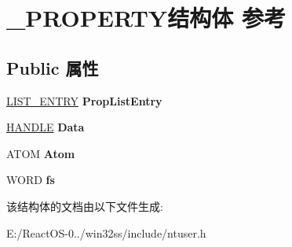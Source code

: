\hypertarget{struct___p_r_o_p_e_r_t_y}{}\section{\+\_\+\+P\+R\+O\+P\+E\+R\+T\+Y结构体 参考}
\label{struct___p_r_o_p_e_r_t_y}
\subsection*{Public 属性}
\begin{DoxyCompactItemize}
\item 
\mbox{\label{struct___p_r_o_p_e_r_t_y_a875aeea1fae17a9e8f4f17c9bbbe9da4}} 
\hyperlink{struct___l_i_s_t___e_n_t_r_y}{L\+I\+S\+T\+\_\+\+E\+N\+T\+RY} {\bfseries Prop\+List\+Entry}
\item 
\mbox{\label{struct___p_r_o_p_e_r_t_y_a2832948d6fc1e722b47ad8b60f69d972}} 
\hyperlink{interfacevoid}{H\+A\+N\+D\+LE} {\bfseries Data}
\item 
\mbox{\label{struct___p_r_o_p_e_r_t_y_add52e8feecb71a1f6739ddc3a3ab39fb}} 
A\+T\+OM {\bfseries Atom}
\item 
\mbox{\label{struct___p_r_o_p_e_r_t_y_a1d2837f66b37e82c44cbd34d46cd3952}} 
W\+O\+RD {\bfseries fs}
\end{DoxyCompactItemize}


该结构体的文档由以下文件生成\+:\begin{DoxyCompactItemize}
\item 
E\+:/\+React\+O\+S-\/0../win32ss/include/ntuser.\+h\end{DoxyCompactItemize}
